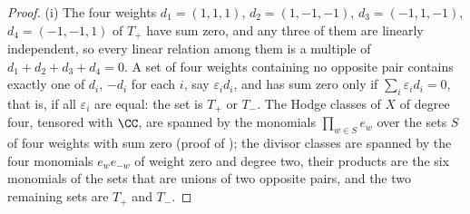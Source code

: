 \begin{proof}
(i) The four weights $d_{1}=(1,1,1)$, $d_{2}=(1,-1,-1)$, $d_{3}=(-1,1,-1)$,
$d_{4}=(-1,-1,1)$ of $T_{+}$ have sum zero, and any three of them are
linearly independent, so every linear relation among them is a multiple of
$d_{1}+d_{2}+d_{3}+d_{4}=0$. A set of four weights containing no opposite
pair contains exactly one of $d_{i}$, $-d_{i}$ for each $i$, say
$\varepsilon_{i}d_{i}$, and has sum zero only if
$\sum_{i}\varepsilon_{i}d_{i}=0$, that is, if all $\varepsilon_{i}$ are
equal: the set is $T_{+}$ or $T_{-}$. The Hodge classes of $X$ of degree
four, tensored with $\CC$, are spanned by the monomials $\prod_{w\in S}e_{w}$
over the sets $S$ of four weights with sum zero (proof of
); the divisor classes are spanned by the four monomials
$e_{w}e_{-w}$ of weight zero and degree two, their products are the six
monomials of the sets that are unions of two opposite pairs, and the two
remaining sets are $T_{+}$ and $T_{-}$.


\end{proof}
